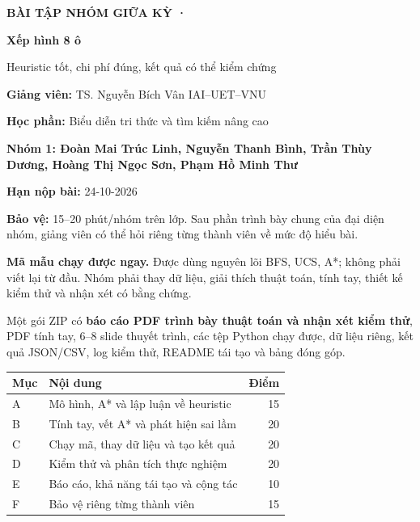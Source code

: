 \documentclass[11pt,a4paper]{article}
\newcommand{\head}[1]{\par\Needspace{4\baselineskip}\medskip{\large\sffamily\bfseries\color{Ink}#1}\par}
\begin{document}
{\sffamily\color{Teal}\bfseries BÀI TẬP NHÓM GIỮA KỲ ·}\par\medskip
{\sffamily\color{Ink}\fontsize{26}{30}\selectfont\bfseries Xếp hình 8 ô}\par\smallskip
{\Large\sffamily Heuristic tốt, chi phí đúng, kết quả có thể kiểm chứng}\par\medskip
\textbf{Giảng viên:} TS. Nguyễn Bích Vân \quad IAI--UET--VNU\par
\textbf{Học phần:} Biểu diễn tri thức và tìm kiếm nâng cao\par
\textbf{Nhóm 1: Đoàn Mai Trúc Linh, Nguyễn Thanh Bình, Trần Thùy Dương, Hoàng Thị Ngọc Sơn, Phạm Hồ Minh Thư}  \quad 

\textbf{Hạn nộp bài:} 24-10-2026\par
\textbf{Bảo vệ:} 15--20 phút/nhóm trên lớp. Sau phần trình bày chung của đại diện nhóm, giảng viên có thể hỏi riêng từng thành viên về mức độ hiểu bài. 
\begin{notice}
\textbf{Mã mẫu chạy được ngay.} Được dùng nguyên lõi BFS, UCS, A*; không phải viết lại từ đầu.
Nhóm phải thay dữ liệu, giải thích thuật toán, tính tay, thiết kế kiểm thử và nhận xét có bằng chứng.
\end{notice}

\head{Sản phẩm cuối}
Một gói ZIP có \textbf{báo cáo PDF trình bày thuật toán và nhận xét kiểm thử}, PDF tính tay,
6--8 slide thuyết trình, các tệp Python chạy được, dữ liệu riêng, kết quả JSON/CSV,
log kiểm thử, README tái tạo và bảng đóng góp. 

\par\begingroup\small\renewcommand{\arraystretch}{1.18}
\begin{tabularx}{\linewidth}{lXr}\toprule
\textbf{Mục} & \textbf{Nội dung} & \textbf{Điểm}\\\midrule
A & Mô hình, A* và lập luận về heuristic & 15\\
B & Tính tay, vết A* và phát hiện sai lầm & 20\\
C & Chạy mã, thay dữ liệu và tạo kết quả & 20\\
D & Kiểm thử và phân tích thực nghiệm & 20\\
E & Báo cáo, khả năng tái tạo và cộng tác & 10\\
F & Bảo vệ riêng từng thành viên & 15\\
\bottomrule\end{tabularx}\endgroup\par
\end{document}
